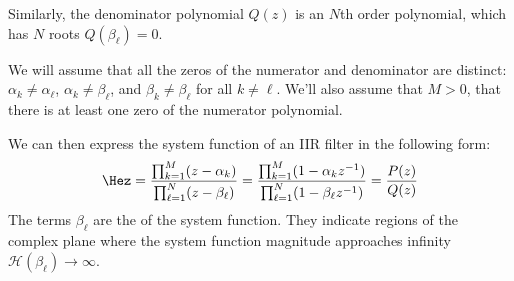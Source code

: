 Similarly, the denominator polynomial $Q(z)$ is an $N$th order
polynomial, which has $N$ roots $Q(\beta_{\ell})=0$. 

We will assume that all the zeros of the numerator and denominator
are distinct: $\alpha_{k} \ne \alpha_{\ell}$,
$\alpha_{k} \ne \beta_{\ell}$, and $\beta_{k} \ne \beta_{\ell}$ for
all $k\ne \ell$. We'll also assume that $M>0$, that there is at least
one zero of the numerator polynomial.

We can then express the system function of an IIR filter in the
following form:
\begin{equation}
\Hez = \frac{\prod_{k=1}^{M}(z-\alpha_{k})}{\prod_{\ell=1}^{N}(z-\beta_{\ell} )} =  \frac{\prod_{k=1}^{M}(1-\alpha_{k}z^{-1})}{\prod_{\ell=1}^{N}(1-\beta_{\ell} z^{-1})} = \frac{P(z)}{Q(z)}
\end{equation}
The terms $\beta_{\ell}$ are the \emph{} of the
system function. They indicate regions of the complex plane where the
system function magnitude approaches infinity
$\mathcal{H}(\beta_{\ell})\rightarrow \infty$.

